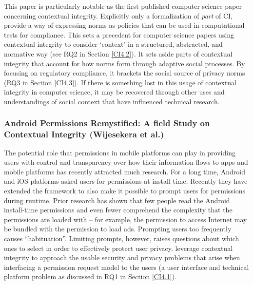 \documentclass[../thesis.tex]{subfiles}
\begin{document}
This paper is particularly notable as the first published computer
science paper concerning contextual integrity. Explicitly only a
formalization of \textit{part} of CI, \citet{barth06sp} provide a
way of expressing norms as policies that can be used in computational
tests for compliance. This sets a precedent for computer science papers
using contextual integrity to consider
`context' in a structured, abstracted,
and normative way (see RQ2 in Section \ref{CI4.2}). It sets aside parts of
contextual integrity that account for how norms form through adaptive
social processes. By focusing on regulatory compliance, it brackets the
social source of privacy norms (RQ3 in Section \ref{CI4.3}). If there is
something lost in this usage of contextual integrity in computer
science, it may be recovered through other uses and understandings of
social context that have influenced technical research.

\subsubsection{Android Permissions Remystified: A field Study on Contextual
  Integrity (Wijesekera et al.)}
\label{CI3.3.2}

The potential role that permissions in
mobile platforms can play in providing users with control and
transparency over how their information flows to apps and mobile
platforms has recently attracted much research. For a long time,
Android and iOS platforms asked users for permissions at install time.
Recently they have extended the framework to also make it possible to
prompt users for permissions during runtime. Prior research has shown
that few people read the Android install-time permissions and even
fewer comprehend the complexity that the permissions are loaded with
-- for example, the permission to access Internet may be bundled with
the permission to load ads. Prompting users too frequently causes
``habituation''. Limiting prompts,
however, raises questions about which ones to select in order to
effectively protect user privacy. \citet{wijesekera2015android} leverage contextual
integrity to approach the usable security and privacy problems that
arise when interfacing a permission request model to the users (a user
interface and technical platform problem as discussed in RQ1 in Section
\ref{CI4.1}).
\end{document}
